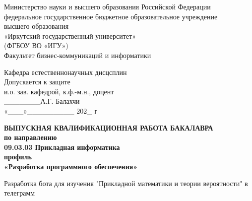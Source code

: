 \documentclass[12pt, oldlfont, amsfonts]{report}
\begin{document}
    \newpage
    \begin{center}
    \linespread{1}
		Министерство науки и высшего образования  Российской Федерации\\
федеральное государственное бюджетное образовательное учреждение\\
высшего образования\\
«Иркутский государственный университет»\\
(ФГБОУ ВО «ИГУ»)\\
Факультет бизнес-коммуникаций и информатики 
    \end{center}
\vspace{1cm}    
\hspace{8cm} 
\begin{minipage}{0.5\textwidth}
\linespread{1}
  \begin{flushleft}
	\small{
    Кафедра естественнонаучных дисцсплин \\%
Допускается к защите \\
и.о. зав. кафедрой, к.ф.-м.н., доцент \\
\_\_\_\_\_\_\_А.Г. Балахчи\\
		«\_\_\_»\_\_\_\_\_\_\_\_\_ 202\_ г \\		}
		
		
		\end{flushleft}
\end{minipage}


    \vspace{2cm}
    \begin{center}
   {\bf ВЫПУСКНАЯ КВАЛИФИКАЦИОННАЯ РАБОТА БАКАЛАВРА\\
    по направлению  \\
		09.03.03 Прикладная информатика\\
		профиль\\
		«Разработка программного обеспечения»\\}
    \end{center}
		
    \begin{center}
  		Разработка бота для изучения "Прикладной математики и теории вероятности" в телеграмм \\
    \end{center}
		
\end{document}
